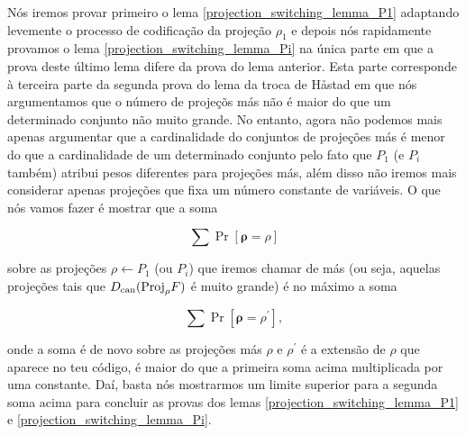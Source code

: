 Nós iremos provar primeiro o lema \ref{projection_switching_lemma_P1} adaptando levemente o processo de codificação da projeção $\rho_{1}$ e depois nós rapidamente provamos o lema \ref{projection_switching_lemma_Pi} na única parte em que a prova deste último lema difere da prova do lema anterior. Esta parte corresponde à terceira parte da segunda prova do lema da troca de Håstad em que nós argumentamos que o número de projeçõs más não é maior do que um determinado conjunto não muito grande. No entanto, agora não podemos mais apenas argumentar que a cardinalidade do conjuntos de projeções más é menor do que a cardinalidade de um determinado conjunto pelo fato que $P_{1}$ (e $P_{i}$ também) atribui pesos diferentes para projeções más, além disso não iremos mais considerar apenas projeções que fixa um número constante de variáveis. O que nós vamos fazer é mostrar que a soma

\begin{equation*}
	\sum \Pr[\boldsymbol{\rho} = \rho]
\end{equation*}

sobre as projeções $\rho \leftarrow P_{1}$ (ou $P_{i}$) que iremos chamar de más (ou seja, aquelas projeções tais que $D_{\text{can}}(\text{Proj}_{\rho}F)$ é muito grande) é no máximo a soma

\begin{equation*}
	\sum \Pr[\boldsymbol{\rho} = \rho^{\prime}],
\end{equation*}

onde a soma é de novo sobre as projeções más $\rho$ e $\rho^{\prime}$ é a extensão de $\rho$ que aparece no teu código, é maior do que a primeira soma acima multiplicada por uma constante. Daí, basta nós mostrarmos um limite superior para a segunda soma acima para concluir as provas dos lemas \ref{projection_switching_lemma_P1} e \ref{projection_switching_lemma_Pi}.

